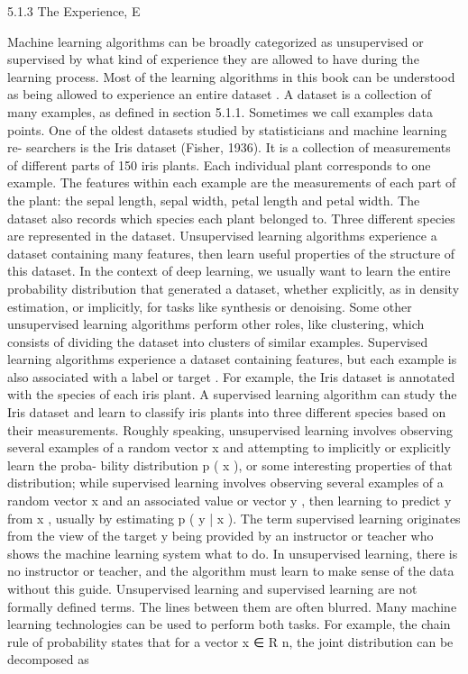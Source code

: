 \documentclass[11pt]{article}
\begin{document}
5.1.3 The Experience, E

Machine learning algorithms can be broadly categorized as unsupervised or supervised by what kind of experience they are allowed to have during the learning process.
Most of the learning algorithms in this book can be understood as being allowed to experience an entire
dataset
. A dataset is a collection of many examples, as
deﬁned in section 5.1.1. Sometimes we call examples data points.
One of the oldest datasets studied by statisticians and machine learning re-
searchers is the Iris dataset (Fisher, 1936). It is a collection of measurements
of diﬀerent parts of 150 iris plants. Each individual plant corresponds to one
example. The features within each example are the measurements of each part
of the plant: the sepal length, sepal width, petal length and petal width. The
dataset also records which species each plant belonged to. Three diﬀerent species
are represented in the dataset.
Unsupervised learning algorithms
experience a dataset containing many
features, then learn useful properties of the structure of this dataset. In the context
of deep learning, we usually want to learn the entire probability distribution that
generated a dataset, whether explicitly, as in density estimation, or implicitly, for
tasks like synthesis or denoising. Some other unsupervised learning algorithms
perform other roles, like clustering, which consists of dividing the dataset into
clusters of similar examples.
Supervised learning algorithms
experience a dataset containing features,
but each example is also associated with a
label
or
target
. For example, the Iris
dataset is annotated with the species of each iris plant. A supervised learning
algorithm can study the Iris dataset and learn to classify iris plants into three
diﬀerent species based on their measurements.
Roughly speaking, unsupervised learning involves observing several examples
of a random vector
x
and attempting to implicitly or explicitly learn the proba-
bility distribution
p
(
x
), or some interesting properties of that distribution; while
supervised learning involves observing several examples of a random vector
x
and
an associated value or vector
y
, then learning to predict
y
from
x
, usually by
estimating
p
(
y | x
).
The term supervised learning originates from the view of the target y being provided by an instructor or teacher who shows the machine learning system what to do.
In unsupervised learning, there is no instructor or
teacher, and the algorithm must learn to make sense of the data without this guide.
Unsupervised learning and supervised learning are not formally deﬁned terms.
The lines between them are often blurred.
Many machine learning technologies can be used to perform both tasks.
For example, the chain rule of probability states that for a vector x ∈ R n, the joint distribution can be decomposed as
\end{document}
